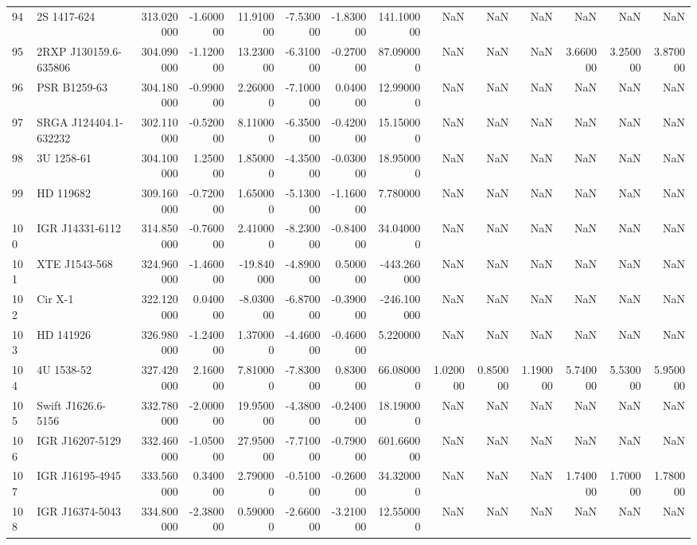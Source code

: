\begin{tabular}{llrrrrrrrrrrrr}
94 & 2S 1417-624 & 313.020000 & -1.600000 & 11.910000 & -7.530000 & -1.830000 & 141.100000 & NaN & NaN & NaN & NaN & NaN & NaN \\
95 & 2RXP J130159.6-635806 & 304.090000 & -1.120000 & 13.230000 & -6.310000 & -0.270000 & 87.090000 & NaN & NaN & NaN & 3.660000 & 3.250000 & 3.870000 \\
96 & PSR B1259-63 & 304.180000 & -0.990000 & 2.260000 & -7.100000 & 0.040000 & 12.990000 & NaN & NaN & NaN & NaN & NaN & NaN \\
97 & SRGA J124404.1-632232 & 302.110000 & -0.520000 & 8.110000 & -6.350000 & -0.420000 & 15.150000 & NaN & NaN & NaN & NaN & NaN & NaN \\
98 & 3U 1258-61 & 304.100000 & 1.250000 & 1.850000 & -4.350000 & -0.030000 & 18.950000 & NaN & NaN & NaN & NaN & NaN & NaN \\
99 & HD 119682 & 309.160000 & -0.720000 & 1.650000 & -5.130000 & -1.160000 & 7.780000 & NaN & NaN & NaN & NaN & NaN & NaN \\
100 & IGR J14331-6112 & 314.850000 & -0.760000 & 2.410000 & -8.230000 & -0.840000 & 34.040000 & NaN & NaN & NaN & NaN & NaN & NaN \\
101 & XTE J1543-568 & 324.960000 & -1.460000 & -19.840000 & -4.890000 & 0.500000 & -443.260000 & NaN & NaN & NaN & NaN & NaN & NaN \\
102 & Cir X-1 & 322.120000 & 0.040000 & -8.030000 & -6.870000 & -0.390000 & -246.100000 & NaN & NaN & NaN & NaN & NaN & NaN \\
103 & HD 141926 & 326.980000 & -1.240000 & 1.370000 & -4.460000 & -0.460000 & 5.220000 & NaN & NaN & NaN & NaN & NaN & NaN \\
104 & 4U 1538-52 & 327.420000 & 2.160000 & 7.810000 & -7.830000 & 0.830000 & 66.080000 & 1.020000 & 0.850000 & 1.190000 & 5.740000 & 5.530000 & 5.950000 \\
105 & Swift J1626.6-5156 & 332.780000 & -2.000000 & 19.950000 & -4.380000 & -0.240000 & 18.190000 & NaN & NaN & NaN & NaN & NaN & NaN \\
106 & IGR J16207-5129 & 332.460000 & -1.050000 & 27.950000 & -7.710000 & -0.790000 & 601.660000 & NaN & NaN & NaN & NaN & NaN & NaN \\
107 & IGR J16195-4945 & 333.560000 & 0.340000 & 2.790000 & -0.510000 & -0.260000 & 34.320000 & NaN & NaN & NaN & 1.740000 & 1.700000 & 1.780000 \\
108 & IGR J16374-5043 & 334.800000 & -2.380000 & 0.590000 & -2.660000 & -3.210000 & 12.550000 & NaN & NaN & NaN & NaN & NaN & NaN \\

\end{tabular}
